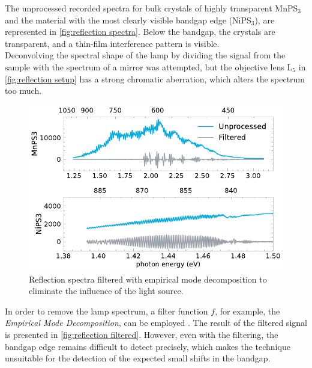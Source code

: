 \documentclass[
	twoside,
	parskip=half,
	a4paper,
]{scrbook}
\begin{document}
The unprocessed recorded spectra for bulk crystals of highly transparent MnPS$_3$ and the material with the most clearly visible bandgap edge (NiPS$_3$), are represented in \autoref{fig:reflection spectra}.
Below the bandgap, the crystals are transparent, and a thin-film interference pattern is visible.\\
Deconvolving the spectral shape of the lamp by dividing the signal from the sample with the spectrum of a mirror was attempted, but the objective lens L$_5$ in \autoref{fig:reflection setup} has a strong chromatic aberration, which alters the spectrum too much.
\begin{figure}
	\centering
	\includegraphics{../figures/2024-03-14 reflection spectra IMF.pdf}
	\caption{Reflection spectra filtered with empirical mode decomposition to eliminate the influence of the light source.}
	\label{fig:reflection filtered}
\end{figure}
In order to remove the lamp spectrum, a filter function $f$, for example, the \textit{Empirical Mode Decomposition}, can be employed \cite{thickness}.
The result of the filtered signal is presented in \autoref{fig:reflection filtered}.
However, even with the filtering, the bandgap edge remains difficult to detect precisely, which makes the technique unsuitable for the detection of the expected small shifts in the bandgap.
\end{document}
